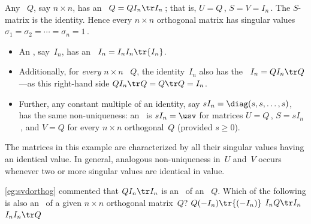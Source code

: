\begin{example} \label{eg:svdorthog}
Any ~\(Q\), say \(n\times n\), has an \svd\ \(Q=QI_n\tr I_n\)\,; that is, \(U=Q\)\,, \(S=V=I_n\)\,.
The \(S\)-matrix is the identity.
Hence every \(n\times n\) orthogonal matrix has singular values \(\sigma_1=\sigma_2=\cdots=\sigma_n=1\)\,.
\end{example}


\begin{example} \label{eg:svdnonuniq}
\begin{itemize}
\item An , say~\(I_n\), has an \svd\ \(I_n=I_nI_n\tr{I_n}\).  
\item Additionally, for \emph{every} \(n\times n\) ~\(Q\), the identity~\(I_n\) also has the \svd\ \(I_n=QI_n\tr Q\)---as this right-hand side \(QI_n\tr Q=Q\tr Q=I_n\).
\item Further, any constant multiple of an identity, say \(sI_n=\diag(s,s,\ldots,s)\), has the same non-uniqueness: an \svd\ is \(sI_n=\usv\) for matrices \(U=Q\)\,, \(S=sI_n\)\,, and \(V=Q\) for every \(n\times n\) orthogonal~\(Q\) (provided \(s\geq0\)).
\end{itemize}
The matrices in this example are characterized by all their singular values having an identical value. 
In general, analogous non-uniqueness in~\(U\) and~\(V\) occurs whenever two or more singular values are identical in value.
\end{example}




\begin{activity}
\cref{eg:svdorthog} commented that \(QI_n\tr I_n\) is an \svd\ of an ~\(Q\).  
Which of the following is also an \svd\ of a given \(n\times n\) orthogonal matrix~\(Q\)?
{\(Q(-I_n)\tr{(-I_n)}\)}
{\(I_nQ\tr I_n\)}
{\(I_nI_n\tr Q\)}
\end{activity}





